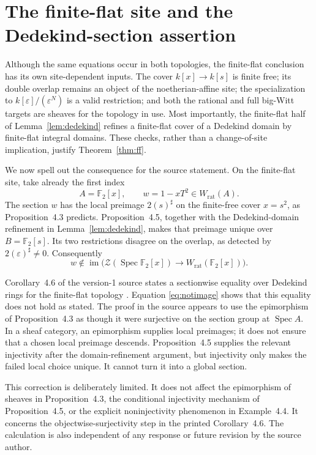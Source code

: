 \documentclass[11pt]{article}
\theoremstyle{definition}
\newcommand{\Spec}{\operatorname{Spec}}
\newcommand{\Wrat}{W_{\mathrm{rat}}}
\newcommand{\Zsh}{\mathcal Z}
\newcommand{\sh}{\sharp}
\begin{document}
\section{The finite-flat site and the Dedekind-section assertion}
\label{sec:finiteflat}

Although the same equations occur in both topologies, the finite-flat
conclusion has its own site-dependent inputs.  The cover
\(k[x]\to k[s]\) is finite free; its double overlap remains an object of
the noetherian-affine site; the specialization to
\(k[\varepsilon]/(\varepsilon^N)\) is a valid restriction; and both the
rational and full big-Witt targets are sheaves for the topology in use.
Most importantly, the finite-flat half of
Lemma~\ref{lem:dedekind} refines a finite-flat cover of a Dedekind domain
by finite-flat integral domains.  These checks, rather than a change-of-site
implication, justify Theorem~\ref{thm:ff}.

We now spell out the consequence for the source statement.  On the
finite-flat site, take already the first index
\[
 A=\mathbb F_2[x],\qquad w=1-xT^2\in\Wrat(A).
 \tag{6.1}\label{eq:cor46example}
\]
The section \(w\) has the local preimage \(2(s)^\sh\) on the finite-free
cover \(x=s^2\), as Proposition~4.3 predicts.  Proposition~4.5, together
with the Dedekind-domain refinement in Lemma~\ref{lem:dedekind}, makes that
preimage unique over \(B=\mathbb F_2[s]\).  Its two restrictions disagree
on the overlap, as detected by \(2(\varepsilon)^\sh\ne0\).  Consequently
\[
 w\notin
 \operatorname{im}\bigl(
 \Zsh(\Spec\mathbb F_2[x])\longrightarrow
 \Wrat(\mathbb F_2[x])\bigr).
 \tag{6.2}\label{eq:notimage}
\]

Corollary~4.6 of the version-1 source states a sectionwise equality over
Dedekind rings for the finite-flat topology
\cite[p.~23]{Deninger2025Rational}.  Equation \eqref{eq:notimage} shows
that this equality does not hold as stated.  The proof in the source
appears to use the epimorphism of Proposition~4.3 as though it were
surjective on the section group at \(\Spec A\).  In a sheaf category, an
epimorphism supplies local preimages; it does not ensure that a chosen
local preimage descends.  Proposition~4.5 supplies the relevant
injectivity after the domain-refinement argument, but injectivity only
makes the failed local choice unique.  It cannot turn it into a global
section.

This correction is deliberately limited.  It does not affect the
epimorphism of sheaves in Proposition~4.3, the conditional injectivity
mechanism of Proposition~4.5, or the explicit noninjectivity phenomenon in
Example~4.4.  It concerns the objectwise-surjectivity step in the printed
Corollary~4.6.  The calculation is also independent of any response or
future revision by the source author.
\end{document}

